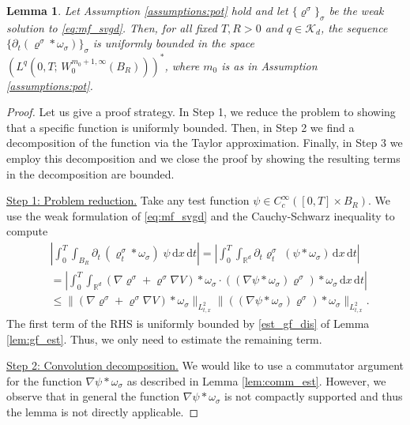\documentclass[reqno, 11pt]{amsart}
\numberwithin{equation}{section}
\newtheorem{lem}[thm]{Lemma}
\theoremstyle{definition}
\begin{document}
\begin{lem}
    \label{bnd:dt_rho_chi}
    Let Assumption \ref{assumptions:pot} hold and let $\{\varrho^\sigma\}_\sigma$ be the weak solution to \eqref{eq:mf_svgd}. Then, for all fixed $T,R>0$ and $q\in \mathcal{K}_d$, the sequence $\{\partial_t(\varrho^\sigma\ast\omega_\sigma)\}_\sigma$ is uniformly bounded in the space $(L^q(0,T;\, W_0^{m_0+1,\infty}(B_R)))^\ast$, where $m_0$ is as in Assumption \ref{assumptions:pot}.
\end{lem}
\begin{proof}
    Let us give a proof strategy. In Step 1, we reduce the problem to showing that a specific function is uniformly bounded. Then, in Step 2 we find a decomposition of the function via the Taylor approximation. Finally, in Step 3 we employ this decomposition and we close the proof by showing the resulting terms in the decomposition are bounded.
    
    \underline{Step 1: Problem reduction.}  Take any test function $\psi\in C_c^\infty([0,T]\times B_R)$. We use the weak formulation of \eqref{eq:mf_svgd} and the Cauchy-Schwarz inequality to compute
    \begin{align*}
        &\left\vert \int_0^T\int_{B_R} \partial_t\,(\varrho_t^\sigma\ast\omega_\sigma)\; \psi\,\mathrm{d} x\,\mathrm{d} t\right\vert
        =\left\vert \int_0^T\int_{\mathbb{R}^{d}} \partial_t\varrho_t^\sigma\;  (\psi\ast \omega_\sigma) \,\mathrm{d} x\,\mathrm{d} t\right\vert\\
        &=\left\vert \int_0^T\int_{\mathbb{R}^{d}} (\nabla\varrho^\sigma+\varrho^\sigma\nabla V)\ast\omega_\sigma\cdot  ((\nabla\psi\ast \omega_\sigma)\varrho^\sigma)\ast\omega_\sigma \,\mathrm{d} x\,\mathrm{d} t\right\vert\\
        &\leq \|(\nabla\varrho^\sigma+\varrho^\sigma\nabla V)\ast\omega_\sigma\|_{L_{t,x}^2}\|((\nabla\psi\ast \omega_\sigma)\varrho^\sigma)\ast\omega_\sigma\|_{L_{t,x}^2}.
    \end{align*}
    The first term of the RHS is uniformly bounded by \ref{est_gf_dis} of Lemma \ref{lem:gf_est}. Thus, we only need to estimate the remaining term.
    
    \underline{Step 2: Convolution decomposition.} We would like to use a commutator argument for the function $\nabla\psi\ast\omega_\sigma$ as described in Lemma \ref{lem:comm_est}. However, we observe that in general the function $\nabla\psi\ast\omega_\sigma$ is not compactly supported and thus the lemma is not directly applicable.
    

\end{proof}
\end{document}
